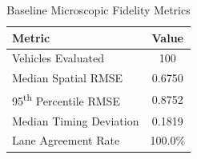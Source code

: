 \begin{table}[h!]
\centering
\begin{tabular}{|l|c|}
\hline
\textbf{Metric} & \textbf{Value} \\
\hline
Vehicles Evaluated & 100 \\
Median Spatial RMSE & 0.6750 \\
95\textsuperscript{th} Percentile RMSE & 0.8752 \\
Median Timing Deviation & 0.1819 \\
Lane Agreement Rate & 100.0\% \\
\hline
\end{tabular}
\caption{Baseline Microscopic Fidelity Metrics}
\label{tab:baseline_metrics}
\end{table}
